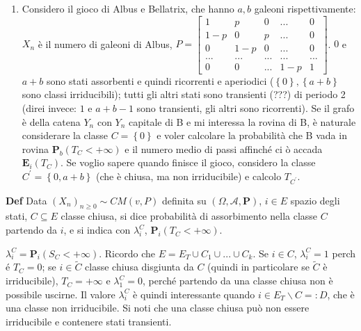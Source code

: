 \documentclass{article}
\begin{document}
\begin{enumerate}
\item Considero il gioco di Albus e Bellatrix, che hanno $a,b$ galeoni
rispettivamente: $X_{n}$ \`{e} il numero di galeoni di Albus, $P=\left[ 
\begin{array}{ccccc}
1 & p & 0 & ... & 0 \\ 
1-p & 0 & p & ... & 0 \\ 
0 & 1-p & 0 & ... & 0 \\ 
... & ... & ... & ... & ... \\ 
0 & 0 & ... & 1-p & 1%
\end{array}%
\right] $. $0$ e $a+b$ sono stati assorbenti e quindi ricorrenti e
aperiodici ($\left\{ 0\right\} ,\left\{ a+b\right\} $ sono classi
irriducibili); tutti gli altri stati sono transienti (???) di periodo 2
(direi invece: $1$ e $a+b-1$ sono transienti, gli altri sono ricorrenti). Se
il grafo \`{e} della catena $Y_{n}$ con $Y_{n}$ capitale di B e mi interessa
la rovina di B, \`{e} naturale considerare la classe $C=\left\{ 0\right\} $
e voler calcolare la probabilit\`{a} che B vada in rovina $\mathbf{P}%
_{b}\left( T_{C}<+\infty \right) $ e il numero medio di passi affinch\'{e} ci%
\`{o} accada $\mathbf{E}_{i}\left( T_{C}\right) $. Se voglio sapere quando
finisce il gioco, considero la classe $C^{\prime }=\left\{ 0,a+b\right\} $
(che \`{e} chiusa, ma non irriducibile) e calcolo $T_{C^{\prime }}$.
\end{enumerate}

\textbf{Def} Data $\left( X_{n}\right) _{n\geq 0}\sim CM\left( v,P\right) $
definita su $\left( \Omega ,\mathcal{A},\mathbf{P}\right) $, $i\in E$ spazio
degli stati, $C\subseteq E$ classe chiusa, si dice probabilit\`{a} di
assorbimento nella classe $C$ partendo da $i$, e si indica con $\lambda
_{i}^{C}$, $\mathbf{P}_{i}\left( T_{C}<+\infty \right) $.

$\lambda _{i}^{C}=\mathbf{P}_{i}\left( S_{C}<+\infty \right) $. Ricordo che $%
E=E_{T}\cup C_{1}\cup ...\cup C_{k}$. Se $i\in C$, $\lambda _{i}^{C}=1$ perch%
\'{e} $T_{C}=0$; se $i\in \tilde{C}$ classe chiusa disgiunta da $C$ (quindi
in particolare se $\tilde{C}$ \`{e} irriducibile), $T_{C}=+\infty $ e $%
\lambda _{1}^{C}=0$, perch\'{e} partendo da una classe chiusa non \`{e}
possibile uscirne. Il valore $\lambda _{i}^{C}$ \`{e} quindi interessante
quando $i\in E_{T}\backslash C=:D$, che \`{e} una classe non irriducibile. Si noti che una classe chiusa pu\`{o} non essere
irriducibile e contenere stati transienti.
\end{document}
